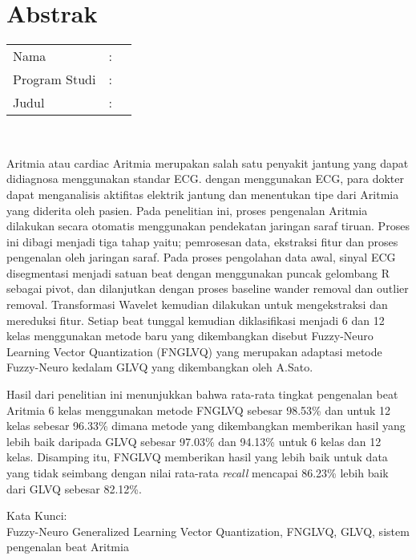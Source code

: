 %
%
%

\chapter*{Abstrak}

\vspace*{0.2cm}

\noindent \begin{tabular}{l l p{10cm}}
	Nama&: & \penulis \\
	Program Studi&: & \programstudi \\
	Judul&: & \judul \\
\end{tabular} \\ 

\vspace*{0.5cm}

\noindent

Aritmia atau cardiac Aritmia merupakan salah satu penyakit jantung yang dapat
didiagnosa menggunakan standar ECG. dengan menggunakan ECG, para dokter dapat
menganalisis aktifitas elektrik jantung dan menentukan tipe dari Aritmia yang
diderita oleh pasien. 
Pada penelitian ini, proses pengenalan Aritmia dilakukan secara
otomatis menggunakan pendekatan jaringan saraf tiruan. Proses ini dibagi menjadi
tiga tahap yaitu; pemrosesan data, ekstraksi fitur dan proses pengenalan
oleh jaringan saraf. Pada proses pengolahan data awal, sinyal ECG disegmentasi
menjadi satuan beat dengan menggunakan puncak gelombang R sebagai pivot, dan
dilanjutkan dengan proses baseline wander removal dan outlier removal.
Transformasi Wavelet kemudian dilakukan untuk mengekstraksi dan mereduksi fitur.
Setiap beat tunggal kemudian diklasifikasi menjadi 6 dan 12 kelas menggunakan
metode baru yang dikembangkan disebut Fuzzy-Neuro Learning Vector
Quantization (FNGLVQ) yang merupakan adaptasi metode Fuzzy-Neuro kedalam GLVQ
yang dikembangkan oleh A.Sato. 

Hasil dari penelitian ini menunjukkan bahwa rata-rata tingkat pengenalan beat
Aritmia 6 kelas menggunakan metode FNGLVQ sebesar 98.53\% dan untuk 12 kelas
sebesar 96.33\% dimana metode yang dikembangkan memberikan hasil yang lebih
baik daripada GLVQ sebesar 97.03\% dan 94.13\% untuk 6 kelas dan 12 kelas.
Disamping itu, FNGLVQ memberikan hasil yang lebih baik untuk data yang tidak
seimbang dengan nilai rata-rata \emph{recall} mencapai 86.23\% lebih baik dari
GLVQ sebesar 82.12\%.
\\

\vspace*{0.2cm}

\noindent Kata Kunci: \\ 
\noindent Fuzzy-Neuro Generalized Learning Vector Quantization, FNGLVQ,
GLVQ, sistem pengenalan beat Aritmia\\

\newpage